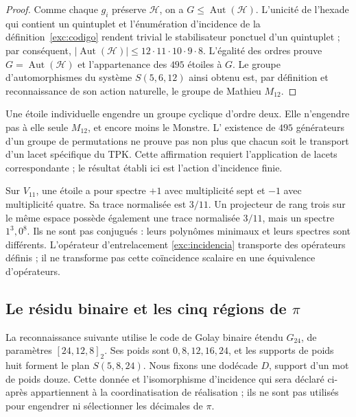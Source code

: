 \begin{proof}
Comme chaque $g_i$ préserve $\mathcal H$, on a
$G\leq\operatorname{Aut}(\mathcal H)$. L'unicité de l'hexade qui
contient un quintuplet et l'énumération d'incidence de la
définition~\ref{exc:codigo} rendent trivial le stabilisateur ponctuel d'un
quintuplet ; par conséquent,
$|\operatorname{Aut}(\mathcal H)|\leq
12\cdot11\cdot10\cdot9\cdot8$. L'égalité des ordres prouve
$G=\operatorname{Aut}(\mathcal H)$ et l'appartenance des $495$ étoiles
à $G$. Le groupe d'automorphismes du système $S(5,6,12)$ ainsi obtenu est,
par définition et reconnaissance de son action naturelle, le groupe de Mathieu
$M_{12}$.
\end{proof}

Une étoile individuelle engendre un groupe cyclique d'ordre deux. Elle
n'engendre pas à elle seule $M_{12}$, et encore moins le Monstre. L'
existence de $495$ générateurs d'un groupe de permutations ne prouve pas non plus que
chacun soit le transport d'un lacet spécifique du TPK. Cette affirmation
requiert l'application de lacets correspondante ; le résultat établi ici
est l'action d'incidence finie.

\begin{remark}
Sur $V_{11}$, une étoile a pour spectre $+1$ avec multiplicité sept
et $-1$ avec multiplicité quatre. Sa trace normalisée est $3/11$.
Un projecteur de rang trois sur le même espace possède également une trace
normalisée $3/11$, mais un spectre $1^3,0^8$. Ils ne sont pas conjugués : leurs
polynômes minimaux et leurs spectres sont différents. L'opérateur d'entrelacement
\eqref{exc:incidencia} transporte des opérateurs définis ; il ne transforme pas
cette coïncidence scalaire en une équivalence d'opérateurs.
\end{remark}

\subsection{Le résidu binaire et les cinq régions de \texorpdfstring{$\pi$}{pi}}
\label{exc:cinco-regiones}

La reconnaissance suivante utilise le code de Golay binaire
étendu $G_{24}$, de paramètres $[24,12,8]_2$. Ses poids sont
$0,8,12,16,24$, et les supports de poids huit forment le plan
$S(5,8,24)$. Nous fixons une dodécade $D$, support d'un mot de poids
douze. Cette donnée et l'isomorphisme d'incidence qui sera déclaré
ci-après appartiennent à la coordinatisation de réalisation ; ils ne sont pas utilisés pour
engendrer ni sélectionner les décimales de $\pi$.

